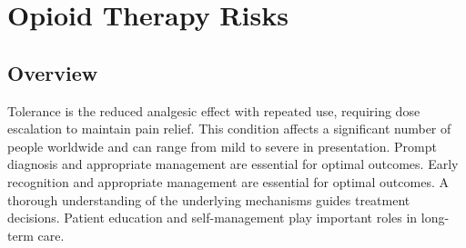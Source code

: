 \chapter{Opioid Therapy Risks}
\label{sec:Opioid Therapy Risks}

\section{Overview}
Tolerance is the reduced analgesic effect with repeated use, requiring dose escalation to maintain pain relief. This condition affects a significant number of people worldwide and can range from mild to severe in presentation. Prompt diagnosis and appropriate management are essential for optimal outcomes. Early recognition and appropriate management are essential for optimal outcomes. A thorough understanding of the underlying mechanisms guides treatment decisions. Patient education and self-management play important roles in long-term care.
